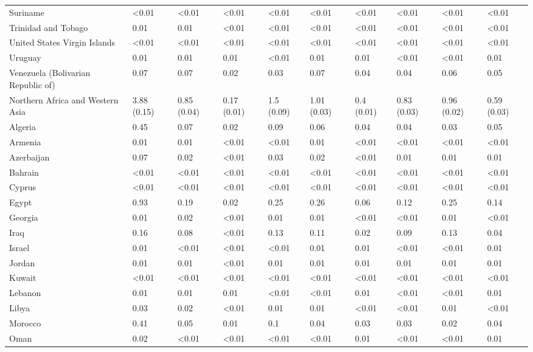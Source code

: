 \begin{longtable}[t]{llllllllll}
\addlinespace
Suriname & <0.01 & <0.01 & <0.01 & <0.01 & <0.01 & <0.01 & <0.01 & <0.01 & <0.01\\
Trinidad and Tobago & 0.01 & 0.01 & <0.01 & <0.01 & <0.01 & <0.01 & <0.01 & <0.01 & <0.01\\
United States Virgin Islands & <0.01 & <0.01 & <0.01 & <0.01 & <0.01 & <0.01 & <0.01 & <0.01 & <0.01\\
Uruguay & 0.01 & 0.01 & 0.01 & <0.01 & 0.01 & 0.01 & <0.01 & <0.01 & 0.01\\
Venezuela (Bolivarian Republic of) & 0.07 & 0.07 & 0.02 & 0.03 & 0.07 & 0.04 & 0.04 & 0.06 & 0.05\\
\addlinespace
Northern Africa and Western Asia & 3.88 (0.15) & 0.85 (0.04) & 0.17 (0.01) & 1.5 (0.09) & 1.01 (0.03) & 0.4 (0.01) & 0.83 (0.03) & 0.96 (0.02) & 0.59 (0.03)\\
Algeria & 0.45 & 0.07 & 0.02 & 0.09 & 0.06 & 0.04 & 0.04 & 0.03 & 0.05\\
Armenia & 0.01 & 0.01 & <0.01 & <0.01 & 0.01 & <0.01 & <0.01 & <0.01 & <0.01\\
Azerbaijan & 0.07 & 0.02 & <0.01 & 0.03 & 0.02 & <0.01 & 0.01 & 0.01 & 0.01\\
Bahrain & <0.01 & <0.01 & <0.01 & <0.01 & <0.01 & <0.01 & <0.01 & <0.01 & <0.01\\
\addlinespace
Cyprus & <0.01 & <0.01 & <0.01 & <0.01 & <0.01 & <0.01 & <0.01 & <0.01 & <0.01\\
Egypt & 0.93 & 0.19 & 0.02 & 0.25 & 0.26 & 0.06 & 0.12 & 0.25 & 0.14\\
Georgia & 0.01 & 0.02 & <0.01 & 0.01 & 0.01 & <0.01 & <0.01 & 0.01 & <0.01\\
Iraq & 0.16 & 0.08 & <0.01 & 0.13 & 0.11 & 0.02 & 0.09 & 0.13 & 0.04\\
Israel & 0.01 & <0.01 & <0.01 & <0.01 & 0.01 & 0.01 & <0.01 & <0.01 & 0.01\\
\addlinespace
Jordan & 0.01 & 0.01 & <0.01 & 0.01 & 0.01 & 0.01 & 0.01 & 0.01 & 0.01\\
Kuwait & <0.01 & <0.01 & <0.01 & <0.01 & <0.01 & <0.01 & <0.01 & <0.01 & <0.01\\
Lebanon & 0.01 & 0.01 & 0.01 & <0.01 & <0.01 & 0.01 & <0.01 & <0.01 & 0.01\\
Libya & 0.03 & 0.02 & <0.01 & 0.01 & 0.01 & <0.01 & <0.01 & 0.01 & <0.01\\
Morocco & 0.41 & 0.05 & 0.01 & 0.1 & 0.04 & 0.03 & 0.03 & 0.02 & 0.04\\
\addlinespace
Oman & 0.02 & <0.01 & <0.01 & <0.01 & <0.01 & 0.01 & <0.01 & <0.01 & 0.01\\

\end{longtable}
